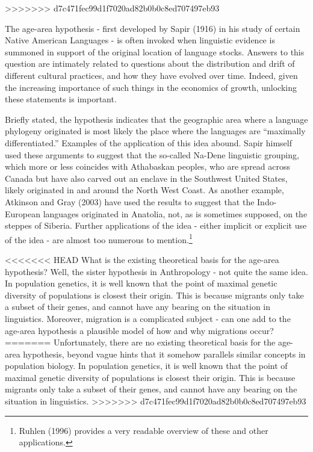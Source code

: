 \documentclass[11pt]{article}
\begin{document}
\doublespacing
>>>>>>> d7c471fec99d1f7020ad82b0b0c8ed707497eb93

The age-area hypothesis - first developed by Sapir (1916) in his study of certain Native American Languages - is often invoked when linguistic
evidence is summoned in support of the original location of language stocks. Answers to this question are intimately related to questions about the distribution and drift of different cultural practices, and how they have evolved over time. Indeed, given the increasing importance of such things in the economics of growth, unlocking these statements is important. 

Briefly stated, the hypothesis indicates that the geographic area where a language phylogeny originated
is most likely the place where the languages are ``maximally differentiated.'' Examples of the application of this idea abound. Sapir himself used these arguments to suggest that the so-called Na-Dene linguistic grouping, which more or less coincides with Athabaskan peoples, who are spread across Canada but have also carved out an enclave in the Southwest United States, likely originated in and around the North West Coast. As another example, Atkinson and Gray (2003) have used the results to suggest that the Indo-European languages originated in Anatolia, not, as is sometimes supposed, on the steppes of Siberia. Further applications of the idea - either implicit or explicit use of the idea - are almost too numerous to mention.\footnote{Ruhlen (1996) provides a very readable overview of these and other applications.}

<<<<<<< HEAD
What is the existing theoretical basis for the age-area hypothesis? Well, the sister hypothesis in Anthropology - not quite the same idea. In population genetics, it is well known that
the point of maximal genetic diversity of populations is closest their origin. This is because migrants only take a subset of their genes, and cannot have any bearing on the situation
in linguistics. Moreover, migration is a complicated subject - can one add to the age-area hypothesis a plausible model of how and why migrations occur?
=======
Unfortunately, there are no existing theoretical basis for the age-area hypothesis, beyond vague hints that it somehow parallels similar concepts in population biology. In population genetics, it is well known that the point of maximal genetic diversity of populations is closest their origin. This is because migrants only take a subset of their genes, and cannot have any bearing on the situation
in linguistics.
>>>>>>> d7c471fec99d1f7020ad82b0b0c8ed707497eb93
\end{document}
